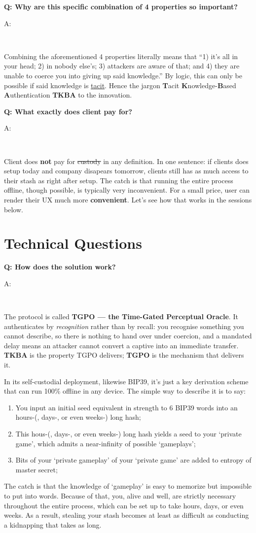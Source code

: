 \documentclass[12pt,a4paper]{article}
\newenvironment{question}[1]{%
  \vspace{0.8em}\noindent\textbf{Q: #1}\par
  \vspace{0.2em}\noindent\begin{itshape}A:\end{itshape}~%
}{\vspace{0.8em}}
\begin{document}
\begin{question}{Why are this specific combination of 4 properties so important?}
\begin{enumerate}
 \end{enumerate}
Combining the aforementioned 4 properties literally means that ``1) it's all in your head; 2) in nobody else's; 3) attackers are aware of that; and 4) they are unable to coerce you into giving up said knowledge.'' By logic, this can only be possible if said knowledge is \href{https://en.wikipedia.org/wiki/Tacit_knowledge}{tacit}. Hence the jargon \textbf{T}acit \textbf{K}nowledge-\textbf{B}ased \textbf{A}uthentication \textbf{TKBA} to the innovation.
\end{question}

\begin{question}{What exactly does client pay for?}
Client does \textbf{not} pay for \sout{custody} in any definition. In one sentence: if clients does setup today and company disapears tomorrow, clients still has as much access to their stash as right after setup. The catch is that running the entire process offline, though possible, is typically very inconvenient. For a small price, user can render their UX much more \textbf{convenient}. Let's see how that works in the sessions below.
\end{question}

\section{Technical Questions}

\begin{question}{How does the solution work?}
The protocol is called \textbf{TGPO --- the Time-Gated Perceptual Oracle}. It authenticates by \emph{recognition} rather than by recall: you recognise something you cannot describe, so there is nothing to hand over under coercion, and a mandated delay means an attacker cannot convert a captive into an immediate transfer. \textbf{TKBA} is the property TGPO delivers; \textbf{TGPO} is the mechanism that delivers it.

In its self-custodial deployment, likewise BIP39, it's just a key derivation scheme that can run 100\% offline in any device. The simple way to describe it is to say:
\begin{enumerate}
 \item You input an initial seed equivalent in strength to 6 BIP39 words into an hours-(, days-, or even weeks-) long hash;
 \item This hous-(, days-, or even weeks-) long hash yields a seed to your `private game', which admits a near-infinity of possible `gameplays';
 \item Bits of your `private gameplay' of your `private game' are added to entropy of master secret;
\end{enumerate}
The catch is that the knowledge of `gameplay' is easy to memorize but impossible to put into words. Because of that, you, alive and well, are strictly necessary throughout the entire process, which can be set up to take hours, days, or even weeks. As a result, stealing your stash becomes at least as difficult as conducting a kidnapping that takes as long.
\end{question}
\end{document}
